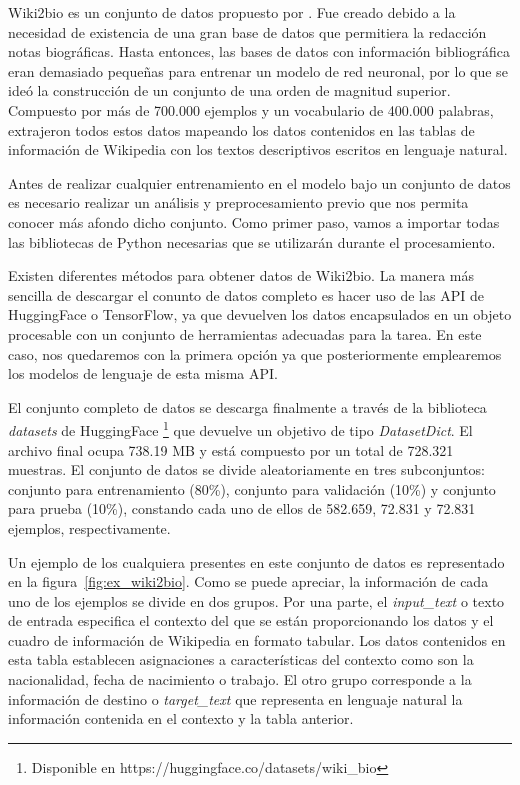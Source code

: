 Wiki2bio es un conjunto de datos propuesto por \citep{lebret-etal-2016-neural}. Fue creado debido a la necesidad de existencia de una gran base de datos que permitiera la redacción notas biográficas. Hasta entonces, las bases de datos con información bibliográfica eran demasiado pequeñas para entrenar un modelo de red neuronal, por lo que se ideó la construcción de un conjunto de una orden de magnitud superior. Compuesto por más de 700.000 ejemplos y un vocabulario de 400.000 palabras, extrajeron todos estos datos mapeando los datos contenidos en las tablas de información de Wikipedia con los textos descriptivos escritos en lenguaje natural.

Antes de realizar cualquier entrenamiento en el modelo bajo un conjunto de datos es necesario realizar un análisis y preprocesamiento previo que nos permita conocer más afondo dicho conjunto. Como primer paso, vamos a importar todas las bibliotecas de Python necesarias que se utilizarán durante el procesamiento.

Existen diferentes métodos para obtener datos de Wiki2bio. La manera más sencilla de descargar el conunto de datos completo es hacer uso de las API de HuggingFace o TensorFlow, ya que devuelven los datos encapsulados en un objeto procesable con un conjunto de herramientas adecuadas para la tarea. En este caso, nos quedaremos con la primera opción ya que posteriormente emplearemos los modelos de lenguaje de esta misma API. 

El conjunto completo de datos se descarga finalmente a través de la biblioteca \textit{datasets} de HuggingFace \footnote{Disponible en https://huggingface.co/datasets/wiki\_bio} que devuelve un objetivo de tipo \textit{DatasetDict}. El archivo final ocupa 738.19 MB y está compuesto por un total de 728.321 muestras.
El conjunto de datos se divide aleatoriamente en tres subconjuntos: conjunto para entrenamiento (80\%), conjunto para validación (10\%) y conjunto para prueba (10\%), constando cada uno de ellos de 582.659, 72.831 y 72.831 ejemplos, respectivamente.

Un ejemplo de los cualquiera presentes en este conjunto de datos es representado en la figura~\ref{fig:ex_wiki2bio}. Como se puede apreciar, la información de cada uno de los ejemplos se divide en dos grupos. Por una parte, el \textit{input\_text} o texto de entrada especifica el contexto del que se están proporcionando los datos y el cuadro de información de Wikipedia en formato tabular. Los datos contenidos en esta tabla establecen asignaciones a características del contexto como son la nacionalidad, fecha de nacimiento o trabajo. El otro grupo corresponde a la información de destino o \textit{target\_text} que representa en lenguaje natural la información contenida en el contexto y la tabla anterior.


